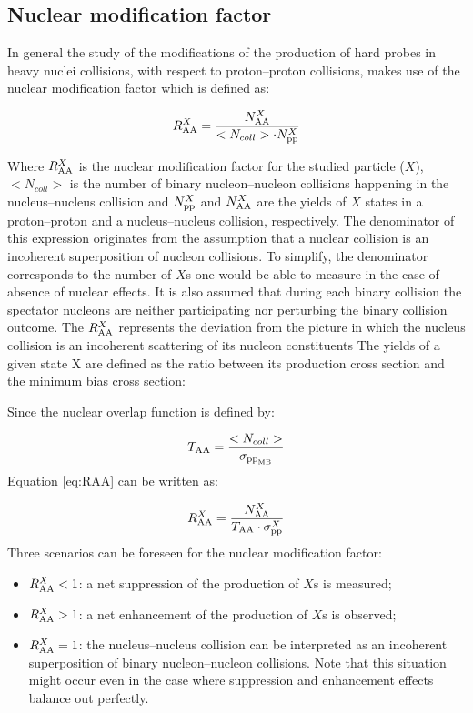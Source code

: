 \subsection{Nuclear modification factor}\label{RAA}
In general the study of the modifications of the production of hard probes in heavy nuclei collisions, with respect to proton--proton collisions, makes use of the nuclear modification factor which is defined as:

\begin{equation}
\label{eq:RAA}
R_{\rm{AA}}^X = \frac{N_{\rm{AA}}^X}{<N_{coll}>\cdot N_{\rm{pp}}^X}
\end{equation}

Where $R_{\rm{AA}}^X$ is the nuclear modification factor for the studied particle ($X$), $<N_{coll}>$ is the number of binary nucleon--nucleon collisions happening in the nucleus--nucleus collision and $N_{\rm{pp}}^X$ and $N_{\rm{AA}}^X$ are the yields of $X$ states in a proton--proton and a nucleus--nucleus collision, respectively.
The denominator of this expression originates from the assumption that a nuclear collision is an incoherent superposition of nucleon collisions.
To simplify, the denominator corresponds to the number of $X$s one would be able to measure in the case of absence of nuclear effects.
It is also assumed that during each binary collision the spectator nucleons are neither participating nor perturbing the binary collision outcome.
The $R_{\rm{AA}}^X$ represents the deviation from the picture in which the nucleus collision is an incoherent scattering of its nucleon constituents
The yields of a given state X are defined as the ratio between its production cross section and the minimum bias cross section:


Since the nuclear overlap function is defined by:

\begin{equation}
\label{eq:TAA}
T_{\rm{AA}} = \frac{<N_{coll}>}{\sigma_{\rm{pp}_{MB}}}
\end{equation}
Equation \ref{eq:RAA} can be written as:

\begin{equation}
\label{eq:RAA2}
R_{\rm{AA}}^X = \frac{N_{\rm{AA}}^X}{T_{\rm{AA}} \cdot \sigma_{\rm{pp}}^X}
\end{equation}
Three scenarios can be foreseen for the nuclear modification factor:
\begin{itemize}
\item $R_{\rm{AA}}^X<1$: a net suppression of the production of $X$s is measured;
\item $R_{\rm{AA}}^X>1$: a net enhancement of the production of $X$s is observed; 
\item $R_{\rm{AA}}^X=1$: the nucleus--nucleus collision can be interpreted as an incoherent superposition of binary nucleon--nucleon collisions. Note that this situation might occur even in the case where suppression and enhancement effects balance out perfectly.
\end{itemize}


